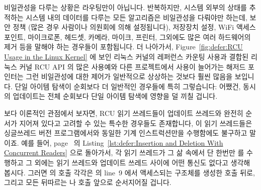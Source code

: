 비일관성을 다루는 상황은 라우팅만이 아닙니다.
반복하지만, 시스템 외부의 상태를 추적하는 시스템 내의 데이터를 다루는 모든
알고리즘은 비일관성을 다뤄야만 하는데, 보안 정책 (많은 경우 사람이나 의원회에
의해 설정됩니다), 저장장치 설정, WiFi 액세스 포인트, 마이크로폰, 헤드셋,
카메라, 마이크, 프린터, 그외에도 많은 여러 하드웨어의 제거 등을 말해야 하는
경우들이 포함됩니다.
더 나아가서,
Figure~\ref{fig:defer:RCU Usage in the Linux Kernel} 에 보인 리눅스 커널의
레퍼런스 카운팅 사용과 결합된 리눅스 커널 RCU API 의 많은 사용예와 다른
프로젝트에서 사용이 늘어가는 해저드 포인터는 그런 비일관성에 대한 제어가
일반적으로 상상하는 것보다 훨씬 많음을 보입니다.
단일 아이템 탐색이 순회보다 더 일반적인 경우들에 특히 그렇습니다: 어쨌건,
동시의 업데이트는 전체 순회보다 단일 아이템 탐색에 영향을 덜 끼칠 겁니다.

보다 이론적인 관점에서 보자면, RCU 읽기 쓰레드들이 업데이트 쓰레드와 완전히
순서가 지어져 있다고 고려할 수 있는 특수한 경우들도 존재합니다, 이 읽기
쓰레드들은 싱글쓰레드 버전 프로그램에서와 동일한 기계 인스트럭션만을 수행함에도
불구하고 말이죠.
예를 들어,
page~\pageref{lst:defer:Insertion and Deletion With Concurrent Readers} 의
Listing~\ref{lst:defer:Insertion and Deletion With Concurrent Readers}
으로 돌아가서, 각 읽기 쓰레드가 그 삶 속에서 단 한번만  를
수행하고 그 외에는 읽기 쓰레드와 업데이트 쓰레드 사이에 어떤 통신도 없다고
생각해 봅시다.
그러면  의 호출 각각은  의 line~9 에서
액세스되는  구조체를 생성한  호출 뒤로, 그리고 모든
뒤따르는  나  호출 앞으로 순서지어질 겁니다.
\iffalse


